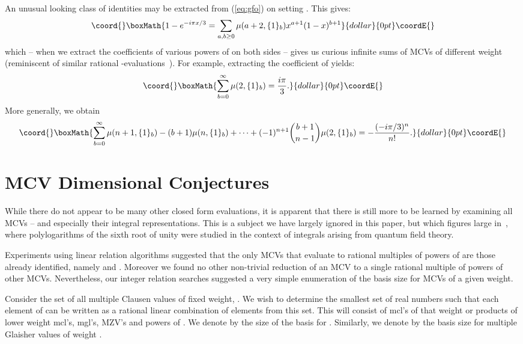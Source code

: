 \documentclass[a4paper,a4paper]{article}
\providecommand{\mcl}{\operatorname{mcl}}
\providecommand{\mgl}{\operatorname{mgl}}
\begin{document}
\vspace{\baselineskip}

An unusual looking class of identities may be extracted from (\ref{eq:gfo})
 on setting \coordHE{}.  This gives:
$$\coord{}\boxMath{
1 - e^{-i\pi x /3} = \sum_{a,b \ge 0} \mu(a + 2, \{1 \}_b) x^{a+1}
(1-x)^{b+1}
}{dollar}{0pt}\coordE{}$$
which -- when we extract the coefficients of various powers of
 \coordHE{} on both sides -- gives us curious infinite sums of MCVs of
 different weight
 (reminiscent of similar rational \myHighlight{$\zeta$}\coordHE{}-evaluations~\cite{BBC}).
For example, extracting the coefficient of \coordHE{} yields:
$$\coord{}\boxMath{
\sum_{b=0}^\infty \mu(2, \{ 1 \}_b) = \frac{i \pi}{3}.
}{dollar}{0pt}\coordE{}$$
More generally,  we obtain
$$\coord{}\boxMath{
\sum_{b=0}^\infty \mu(n+1, \{ 1 \}_b)
 - (b+1)\mu(n, \{ 1 \}_b)
 + \dots + (-1)^{n+1} {b + 1 \choose n - 1} \mu(2, \{ 1 \}_b)
 =-\frac{(-i \pi/3)^n}{n!}.
}{dollar}{0pt}\coordE{}$$




\section{MCV Dimensional Conjectures}

While there do not appear to be many other closed form
evaluations, it is apparent that there is still more to be learned by
 examining all MCVs -- and especially their integral
 representations. This is a subject
 we have largely ignored in this paper, but which figures large
  in~\cite{sixth}, where polylogarithms of the sixth root of unity
  were studied in the context of integrals arising
  from quantum field theory.

 Experiments using linear relation algorithms suggested that
the only MCVs that evaluate
to      rational multiples of powers of \myHighlight{$ \pi $}\coordHE{}
are those already identified,
namely \myHighlight{$ \mgl(3,1) $}\coordHE{}    and
\myHighlight{$ \mgl(\{ 1 \}_b , 2, \{ 1 \}_a) $}\coordHE{}.
Moreover we found no other non-trivial
reduction of an MCV to a single rational
multiple of powers of other MCVs.
Nevertheless,   our integer relation
searches suggested a very simple enumeration of
the basis size for MCVs of a given weight.

Consider the set
\myHighlight{$ {\cal C}(n) :=\{ \mcl(a_1, \dots, a_k) : a_1 + \dots + a_k = n \}$}\coordHE{}
of      all multiple Clausen values
of fixed weight, \coordHE{}.
We wish to determine    the smallest set of real numbers such that each
   element of \coordHE{}
   can be written as a rational linear combination of elements
    from this set.
    This will consist of mcl's of that weight
     or products of lower weight mcl's, mgl's, MZV's and powers of \myHighlight{$ \pi $}\coordHE{}.
     We denote by \coordHE{} the size of the basis for \coordHE{}.
     Similarly, we denote by \coordHE{} the basis size for multiple Glaisher
     values
     of weight \coordHE{}.
\end{document}
